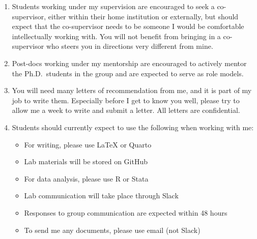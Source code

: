 \documentclass[12pt]{article}
\begin{document}
\begin{enumerate}
\item Students working under my supervision are encouraged to seek a co-supervisor, either within their home institution or externally, but should expect that the co-supervisor needs to be someone I would be comfortable intellectually working with. You will not benefit from bringing in a co-supervisor who steers you in directions very different from mine.

\item Post-docs working under my mentorship are encouraged to actively mentor the Ph.D.\ students in the group and are expected to serve as role models.

\item You will need many letters of recommendation from me, and it is part of my job to write them. Especially before I get to know you well, please try to allow me a week to write and submit a letter. All letters are confidential.

\item Students should currently expect to use the following when working with me:
\begin{itemize}
\item For writing, please use \LaTeX{} or Quarto
\item Lab materials will be stored on GitHub
\item For data analysis, please use R or Stata
\item Lab communication will take place through Slack
\item Responses to group communication are expected within 48 hours
\item To send me any documents, please use email (not Slack)
\end{itemize}

\end{enumerate}
\end{document}
